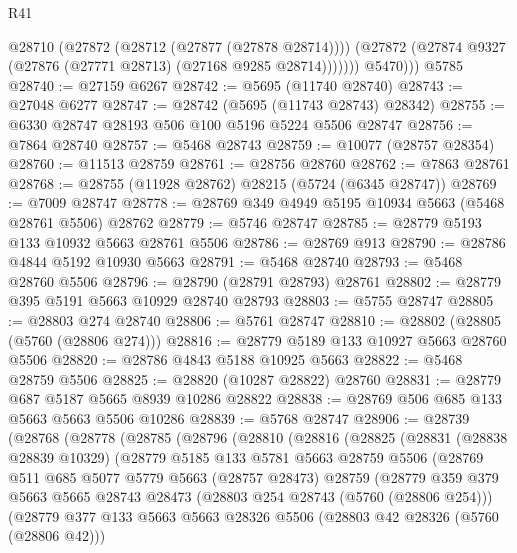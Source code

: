 \begin{lexlean}{R41}
\begin{coremodule}
            @28710
              (@27872 (@28712 (@27877 (@27878 @28714))))
              (@27872 (@27874 @9327 (@27876 (@27771 @28713) (@27168 @9285 @28714)))))))
          @5470)))
    @5785
@28740 := @27159 @6267
@28742 := @5695 (@11740 @28740)
@28743 := @27048 @6277
@28747 := @28742 (@5695 (@11743 @28743) @28342)
@28755 := @6330 @28747 @28193 @506 @100 @5196 @5224 @5506 @28747
@28756 := @7864 @28740
@28757 := @5468 @28743
@28759 := @10077 (@28757 @28354)
@28760 := @11513 @28759
@28761 := @28756 @28760
@28762 := @7863 @28761
@28768 := @28755 (@11928 @28762) @28215 (@5724 (@6345 @28747))
@28769 := @7009 @28747
@28778 := @28769 @349 @4949 @5195 @10934 @5663 (@5468 @28761 @5506) @28762
@28779 := @5746 @28747
@28785 := @28779 @5193 @133 @10932 @5663 @28761 @5506
@28786 := @28769 @913
@28790 := @28786 @4844 @5192 @10930 @5663
@28791 := @5468 @28740
@28793 := @5468 @28760 @5506
@28796 := @28790 (@28791 @28793) @28761
@28802 := @28779 @395 @5191 @5663 @10929 @28740 @28793
@28803 := @5755 @28747
@28805 := @28803 @274 @28740
@28806 := @5761 @28747
@28810 := @28802 (@28805 (@5760 (@28806 @274)))
@28816 := @28779 @5189 @133 @10927 @5663 @28760 @5506
@28820 := @28786 @4843 @5188 @10925 @5663
@28822 := @5468 @28759 @5506
@28825 := @28820 (@10287 @28822) @28760
@28831 := @28779 @687 @5187 @5665 @8939 @10286 @28822
@28838 := @28769 @506 @685 @133 @5663 @5663 @5506 @10286
@28839 := @5768 @28747
@28906 := @28739
    (@28768
      (@28778
        (@28785
          (@28796
            (@28810
              (@28816
                (@28825
                  (@28831
                    (@28838 @28839 @10329)
                    (@28779
                      @5185
                      @133
                      @5781
                      @5663
                      @28759
                      @5506
                      (@28769
                        @511
                        @685
                        @5077
                        @5779
                        @5663
                        (@28757 @28473)
                        @28759
                        (@28779
                          @359
                          @379
                          @5663
                          @5665
                          @28743
                          @28473
                          (@28803 @254 @28743 (@5760 (@28806 @254)))
                          (@28779
                            @377
                            @133
                            @5663
                            @5663
                            @28326
                            @5506
                            (@28803 @42 @28326 (@5760 (@28806 @42)))

\end{coremodule}
\end{lexlean}
